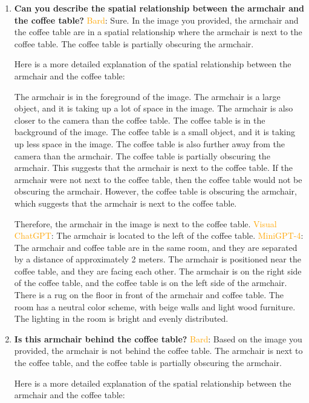 \begin{enumerate}
    \item \textbf{Can you describe the spatial relationship between the armchair and the coffee table?}
    \subitem \textcolor{orange}{Bard}: 
    Sure. In the image you provided, the armchair and the coffee table are in a spatial relationship where the armchair is next to the coffee table. The coffee table is partially obscuring the armchair.
    
    Here is a more detailed explanation of the spatial relationship between the armchair and the coffee table:
    
    The armchair is in the foreground of the image. The armchair is a large object, and it is taking up a lot of space in the image. The armchair is also closer to the camera than the coffee table.
    The coffee table is in the background of the image. The coffee table is a small object, and it is taking up less space in the image. The coffee table is also further away from the camera than the armchair.
    The coffee table is partially obscuring the armchair. This suggests that the armchair is next to the coffee table.
    If the armchair were not next to the coffee table, then the coffee table would not be obscuring the armchair. However, the coffee table is obscuring the armchair, which suggests that the armchair is next to the coffee table.
    
    Therefore, the armchair in the image is next to the coffee table.
    \subitem \textcolor{orange}{Visual ChatGPT}: The armchair is located to the left of the coffee table.
    \subitem \textcolor{orange}{MiniGPT-4}: The armchair and coffee table are in the same room, and they are separated by a distance of approximately 2 meters. The armchair is positioned near the coffee table, and they are facing each other. The armchair is on the right side of the coffee table, and the coffee table is on the left side of the armchair. There is a rug on the floor in front of the armchair and coffee table. The room has a neutral color scheme, with beige walls and light wood furniture. The lighting in the room is bright and evenly distributed.
    \item \textbf{Is this armchair behind the coffee table?}
    \subitem \textcolor{orange}{Bard}: Based on the image you provided, the armchair is not behind the coffee table. The armchair is next to the coffee table, and the coffee table is partially obscuring the armchair.

    Here is a more detailed explanation of the spatial relationship between the armchair and the coffee table:
    

\end{enumerate}
